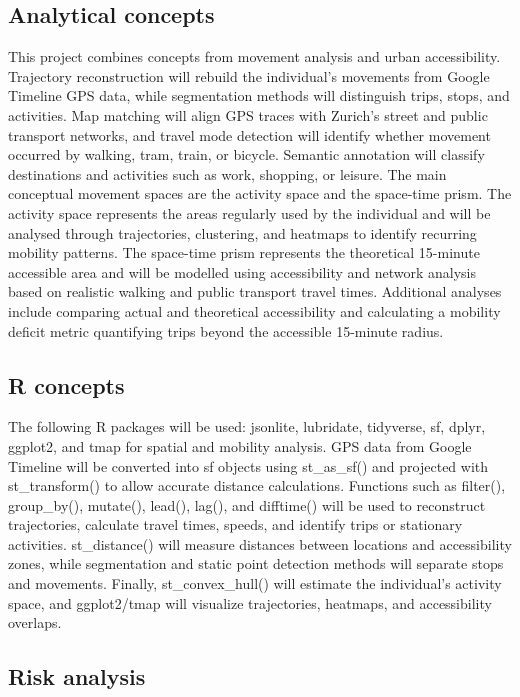 \documentclass[
  letterpaper,
  DIV=11,
  numbers=noendperiod]{scrartcl}
\begin{document}
\subsection{Analytical concepts}\label{analytical-concepts}

This project combines concepts from movement analysis and urban
accessibility. Trajectory reconstruction will rebuild the individual's
movements from Google Timeline GPS data, while segmentation methods will
distinguish trips, stops, and activities. Map matching will align GPS
traces with Zurich's street and public transport networks, and travel
mode detection will identify whether movement occurred by walking, tram,
train, or bicycle. Semantic annotation will classify destinations and
activities such as work, shopping, or leisure. The main conceptual
movement spaces are the activity space and the space-time prism. The
activity space represents the areas regularly used by the individual and
will be analysed through trajectories, clustering, and heatmaps to
identify recurring mobility patterns. The space-time prism represents
the theoretical 15-minute accessible area and will be modelled using
accessibility and network analysis based on realistic walking and public
transport travel times. Additional analyses include comparing actual and
theoretical accessibility and calculating a mobility deficit metric
quantifying trips beyond the accessible 15-minute radius.

\subsection{R concepts}\label{r-concepts}

The following R packages will be used: jsonlite, lubridate, tidyverse,
sf, dplyr, ggplot2, and tmap for spatial and mobility analysis. GPS data
from Google Timeline will be converted into sf objects using
st\_as\_sf() and projected with st\_transform() to allow accurate
distance calculations. Functions such as filter(), group\_by(),
mutate(), lead(), lag(), and difftime() will be used to reconstruct
trajectories, calculate travel times, speeds, and identify trips or
stationary activities. st\_distance() will measure distances between
locations and accessibility zones, while segmentation and static point
detection methods will separate stops and movements. Finally,
st\_convex\_hull() will estimate the individual's activity space, and
ggplot2/tmap will visualize trajectories, heatmaps, and accessibility
overlaps.

\subsection{Risk analysis}\label{risk-analysis}
\end{document}
